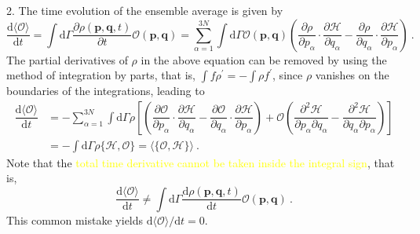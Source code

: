 \documentclass[12pt,a4paper]{article}
\renewcommand{\vec}[1]{\boldsymbol{#1}}
\newcommand{\dif}{\mathrm{d}}
\begin{document}
2.  The time evolution of the ensemble average is given by
\begin{equation}
\dfrac{\dif \langle \mathcal O \rangle}{\dif t} = \int \dif \Gamma \dfrac{\partial \rho(\vec{p}, \vec{q}, t)}{\partial t} \mathcal O(\vec{p}, \vec{q}) = \sum_{\alpha=1}^{3N} \int \dif \Gamma \mathcal O(\vec{p}, \vec{q}) \left(\dfrac{\partial \rho}{\partial p_\alpha}\cdot \dfrac{\partial \mathcal H}{\partial q_\alpha} -\dfrac{\partial \rho}{\partial q_\alpha}\cdot \dfrac{\partial \mathcal H}{\partial p_\alpha}  \right) ~.
\end{equation}
The partial derivatives of $\rho$ in the above equation can be removed by using the method of integration by parts, that is, $\int f \rho^\prime = - \int \rho f^\prime$, since $\rho$ vanishes on the boundaries of the integrations, leading to
\begin{align}
\nonumber \dfrac{\dif \langle \mathcal O \rangle}{\dif t} &= -\sum_{\alpha =1}^{3N} \int \dif \Gamma \rho \left[ \left(\dfrac{\partial \mathcal O}{\partial p_\alpha}\cdot \dfrac{\partial \mathcal H}{\partial q_\alpha} -\dfrac{\partial \mathcal O}{\partial q_\alpha}\cdot \dfrac{\partial \mathcal H}{\partial p_\alpha}  \right) +\mathcal O \left( \dfrac{\partial^2 \mathcal H}{\partial p_\alpha \partial q_\alpha} -\dfrac{\partial^2 \mathcal H}{\partial q_\alpha \partial p_\alpha}  \right) \right] \\
&= -\int \dif \Gamma \rho\{\mathcal H, \mathcal O \} = \langle \{\mathcal O, \mathcal H \}\rangle ~.
\end{align}
Note that the \textcolor{yellow}{total time derivative cannot be taken inside the integral sign}, that is,
\begin{equation}
\dfrac{\dif \langle \mathcal O \rangle}{\dif t} \neq \int \dif \Gamma \dfrac{\dif \rho(\vec{p}, \vec{q}, t)}{\dif t} \mathcal O(\vec{p}, \vec{q}) ~.
\end{equation}
This common mistake yields $\dif \langle \mathcal O \rangle/ \dif t = 0$.
\end{document}
